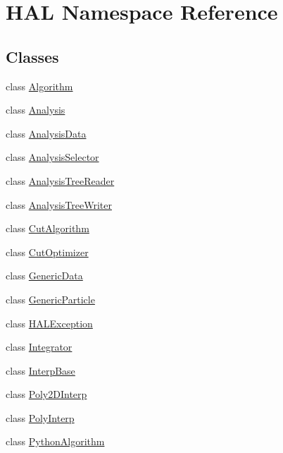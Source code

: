 \hypertarget{namespace_h_a_l}{\section{H\+A\+L Namespace Reference}
\label{namespace_h_a_l}
}
\subsection*{Classes}
\begin{DoxyCompactItemize}
\item 
class \hyperlink{class_h_a_l_1_1_algorithm}{Algorithm}
\item 
class \hyperlink{class_h_a_l_1_1_analysis}{Analysis}
\item 
class \hyperlink{class_h_a_l_1_1_analysis_data}{Analysis\+Data}
\item 
class \hyperlink{class_h_a_l_1_1_analysis_selector}{Analysis\+Selector}
\item 
class \hyperlink{class_h_a_l_1_1_analysis_tree_reader}{Analysis\+Tree\+Reader}
\item 
class \hyperlink{class_h_a_l_1_1_analysis_tree_writer}{Analysis\+Tree\+Writer}
\item 
class \hyperlink{class_h_a_l_1_1_cut_algorithm}{Cut\+Algorithm}
\item 
class \hyperlink{class_h_a_l_1_1_cut_optimizer}{Cut\+Optimizer}
\item 
class \hyperlink{class_h_a_l_1_1_generic_data}{Generic\+Data}
\item 
class \hyperlink{class_h_a_l_1_1_generic_particle}{Generic\+Particle}
\item 
class \hyperlink{class_h_a_l_1_1_h_a_l_exception}{H\+A\+L\+Exception}
\item 
class \hyperlink{class_h_a_l_1_1_integrator}{Integrator}
\item 
class \hyperlink{class_h_a_l_1_1_interp_base}{Interp\+Base}
\item 
class \hyperlink{class_h_a_l_1_1_poly2_d_interp}{Poly2\+D\+Interp}
\item 
class \hyperlink{class_h_a_l_1_1_poly_interp}{Poly\+Interp}
\item 
class \hyperlink{class_h_a_l_1_1_python_algorithm}{Python\+Algorithm}
\end{DoxyCompactItemize}
